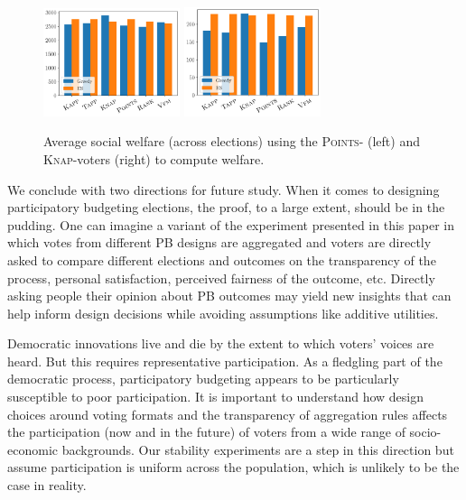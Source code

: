 \documentclass[letterpaper]{article} %
\newcommand{\points}{\textsc{Points}}
\newcommand{\knap}{\textsc{Knap}}
\begin{document}
\begin{figure}[!t]
\begin{center}
\includegraphics[width=4cm]{experiment/Utilities_welfare.png}
\includegraphics[width=4cm]{experiment/Knapsack_welfare.png}

\caption{Average social welfare (across elections) using the \points- (left) and \knap-voters (right) to compute welfare.
}\label{fig:welfare}
\end{center}\vspace{-5mm}
\end{figure}

We conclude with  two directions for future study. %
When it comes to designing participatory budgeting elections, the proof, to a large extent, should be in the pudding.  %
One can imagine a  variant of the experiment presented in this paper in which votes from different PB designs are aggregated and voters are directly asked to compare different elections and outcomes on the transparency of the process, personal satisfaction, perceived fairness of the outcome, etc. 
Directly asking people their opinion about PB outcomes may yield new  insights   that can help inform design decisions while avoiding assumptions like  additive utilities. 

Democratic innovations live and die by the extent to which voters' voices are heard. But this requires representative participation. %
As a fledgling part of the democratic process, participatory budgeting appears to be particularly susceptible to poor participation. It is important to understand how   design choices around voting formats and the transparency of aggregation rules affects the participation (now and in the future) of voters from a wide range of socio-economic backgrounds. Our stability experiments are a step in this direction but assume participation is uniform across the population, which is unlikely to be the case in reality. 
\end{document}
